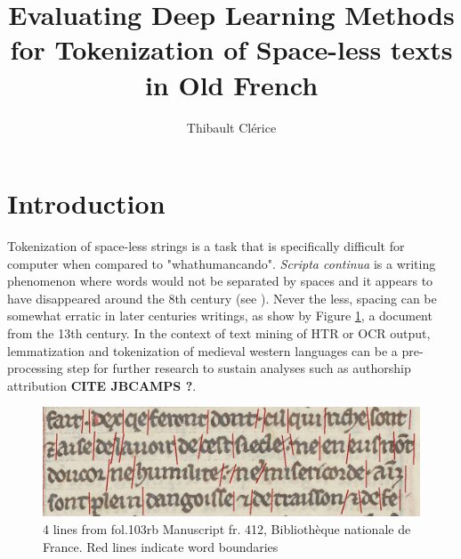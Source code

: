 \documentclass{jdmdh}
\title{Evaluating Deep Learning Methods for Tokenization of Space-less texts in Old French}
\author[1]{Thibault Clérice}
\affil[1]{École nationale des Chartes, France}
\affil[2]{Université Lyon 3, France}
\begin{document}
\maketitle



\section{Introduction}


Tokenization of space-less strings is a task that is specifically difficult for computer when compared to "whathumancando". \textit{Scripta continua} is a writing phenomenon where words would not be separated by spaces and it appears to have disappeared around the 8th century (see \citet{zanna1998lecture}). Never the less, spacing can be somewhat erratic in later centuries writings, as show by Figure \ref{fig:4lines}, a document from the 13th century. In the context of text mining of HTR or OCR output, lemmatization and tokenization of medieval western languages can be a pre-processing step for further research to sustain analyses such as authorship attribution \textbf{CITE JBCAMPS ?}.

\begin{figure}
  \centering
  \includegraphics[width=\linewidth]{4-lines-p0215.png}

  \caption{ 4 lines from fol.103rb Manuscript fr. 412, Bibliothèque nationale de France.  Red lines indicate word boundaries}
  \label{fig:4lines}
\end{figure}
\end{document}
